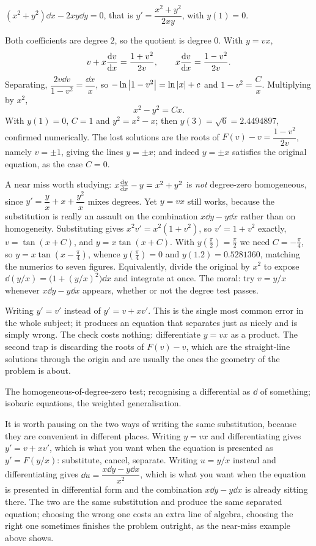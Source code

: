 \begin{worked}
$(x^{2}+y^{2})\dd x-2xy\dd y=0$, that is $y'=\dfrac{x^{2}+y^{2}}{2xy}$, with $y(1)=0$.

Both coefficients are degree $2$, so the quotient is degree $0$. With $y=vx$,
\[v+x\frac{\mathrm{d}v}{\mathrm{d}x}=\frac{1+v^{2}}{2v},\qquad x\frac{\mathrm{d}v}{\mathrm{d}x}=\frac{1-v^{2}}{2v}.\]
Separating, $\dfrac{2v\dd v}{1-v^{2}}=\dfrac{\dd x}{x}$, so $-\ln\left\lvert 1-v^{2}\right\rvert=\ln\left\lvert x\right\rvert+c$ and $1-v^{2}=\dfrac{C}{x}$. Multiplying by $x^{2}$,
\[x^{2}-y^{2}=Cx.\]
With $y(1)=0$, $C=1$ and $y^{2}=x^{2}-x$; then $y(3)=\sqrt6=2.4494897$, confirmed numerically. The lost solutions are the roots of $F(v)-v=\dfrac{1-v^{2}}{2v}$, namely $v=\pm1$, giving the lines $y=\pm x$; and indeed $y=\pm x$ satisfies the original equation, as the case $C=0$.

A near miss worth studying: $x\frac{\mathrm{d}y}{\mathrm{d}x}-y=x^{2}+y^{2}$ is \emph{not} degree-zero homogeneous, since $y'=\dfrac{y}{x}+x+\dfrac{y^{2}}{x}$ mixes degrees. Yet $y=vx$ still works, because the substitution is really an assault on the combination $x\dd y-y\dd x$ rather than on homogeneity. Substituting gives $x^{2}v'=x^{2}(1+v^{2})$, so $v'=1+v^{2}$ exactly, $v=\tan(x+C)$, and $y=x\tan(x+C)$. With $y(\tfrac{\pi}{2})=\tfrac{\pi}{2}$ we need $C=-\tfrac{\pi}{4}$, so $y=x\tan\!\left(x-\tfrac{\pi}{4}\right)$, whence $y(\tfrac{\pi}{4})=0$ and $y(1.2)=0.5281360$, matching the numerics to seven figures. Equivalently, divide the original by $x^{2}$ to expose $\dd(y/x)=\bigl(1+(y/x)^{2}\bigr)\dd x$ and integrate at once. The moral: try $v=y/x$ whenever $x\dd y-y\dd x$ appears, whether or not the degree test passes.
\end{worked}

\begin{trap}
Writing $y'=v'$ instead of $y'=v+xv'$. This is the single most common error in the whole subject; it produces an equation that separates just as nicely and is simply wrong. The check costs nothing: differentiate $y=vx$ as a product. The second trap is discarding the roots of $F(v)-v$, which are the straight-line solutions through the origin and are usually the ones the geometry of the problem is about.
\end{trap}

\begin{seealsob}The homogeneous-of-degree-zero test; recognising a differential as $\dd$ of something; isobaric equations, the weighted generalisation.\end{seealsob}

It is worth pausing on the two ways of writing the same substitution, because they are convenient in different places. Writing $y=vx$ and differentiating gives $y'=v+xv'$, which is what you want when the equation is presented as $y'=F(y/x)$: substitute, cancel, separate. Writing $u=y/x$ instead and differentiating gives $\dd u=\dfrac{x\dd y-y\dd x}{x^{2}}$, which is what you want when the equation is presented in differential form and the combination $x\dd y-y\dd x$ is already sitting there. The two are the same substitution and produce the same separated equation; choosing the wrong one costs an extra line of algebra, choosing the right one sometimes finishes the problem outright, as the near-miss example above shows.

